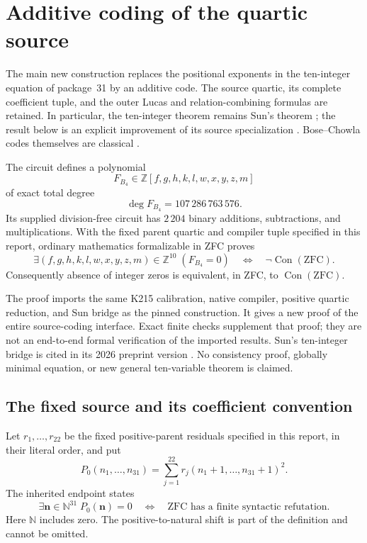 \section{Additive coding of the quartic source}
\label{b4:section}

The main new construction replaces the positional exponents in the
ten-integer equation of package~31 by an additive code.  The source
quartic, its complete coefficient tuple, and the outer Lucas and
relation-combining formulas are retained.  In particular, the
ten-integer theorem remains Sun's theorem \cite{Sun2026}; the result
below is an explicit improvement of its source specialization
\cite{Package31}.  Bose--Chowla codes themselves are classical
\cite{BoseChowla}.

\begin{theorem}
\label{b4:main}
The circuit  defines a
polynomial
\[
 F_{B_4}\in\mathbb Z[f,g,h,k,l,w,x,y,z,m]
\]
of exact total degree
\[
 \boxed{\deg F_{B_4}=107\,286\,763\,576.}
\]
Its supplied division-free circuit has $2\,204$ binary additions,
subtractions, and multiplications.  With the fixed parent quartic and
compiler tuple specified in this report, ordinary mathematics
formalizable in ZFC proves
\[
 \exists(f,g,h,k,l,w,x,y,z,m)\in\mathbb Z^{10}\;(F_{B_4}=0)
 \quad\Longleftrightarrow\quad
 \neg\operatorname{Con}(\mathrm{ZFC}).
\]
Consequently absence of integer zeros is equivalent, in ZFC, to
$\operatorname{Con}(\mathrm{ZFC})$.
\end{theorem}

The proof imports the same K215 calibration, native compiler, positive
quartic reduction, and Sun bridge as the pinned construction.  It gives
a new proof of the entire source-coding interface.  Exact finite checks
supplement that proof; they are not an end-to-end formal verification of
the imported results.  Sun's ten-integer bridge is cited in its 2026
preprint version \cite{Sun2026}.  No consistency proof, globally minimal
equation, or new general ten-variable theorem is claimed.

\subsection{The fixed source and its coefficient convention}
\label{b4:source}

Let $r_1,\ldots,r_{22}$ be the fixed positive-parent residuals specified
in this report, in their literal order, and put
\[
 P_0(n_1,\ldots,n_{31})
 =\sum_{j=1}^{22}r_j(n_1+1,\ldots,n_{31}+1)^2.
\]
The inherited endpoint states
\[
 \exists\mathbf n\in\mathbb N^{31}\;P_0(\mathbf n)=0
 \quad\Longleftrightarrow\quad
 \text{ZFC has a finite syntactic refutation}.
 \tag{B4.1}\label{b4:endpoint}
\]
Here $\mathbb N$ includes zero.  The positive-to-natural shift is part
of the definition and cannot be omitted.

